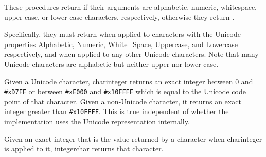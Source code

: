 \begin{entry}{%
}

These procedures return \schtrue{} if their arguments are alphabetic,
numeric, whitespace, upper case, or lower case characters, respectively,
otherwise they return \schfalse.  

Specifically, they must return \schtrue{} when applied to characters with
the Unicode properties Alphabetic, Numeric, White\_Space, Uppercase, and
Lowercase respectively, and \schfalse{} when applied to any other Unicode
characters.  Note that many Unicode characters are alphabetic but neither
upper nor lower case.

\end{entry}


%


\begin{entry}{%
}

Given a Unicode character, 
{\cf char\coerce{}integer} returns an exact integer 
between 0 and {\tt \#xD7FF} or 
between {\tt \#xE000} and {\tt \#x10FFFF} 
which is equal to the Unicode code point of that character.
Given a non-Unicode character, 
it returns an exact integer greater than {\tt \#x10FFFF}.  
This is true independent of whether the implementation uses
the Unicode representation internally.

Given an exact integer that is the value returned by
a character when {\cf char\coerce{}integer} is applied to it, {\cf integer\coerce{}char}
returns that character.
%
%
%
%
%
\end{entry}



